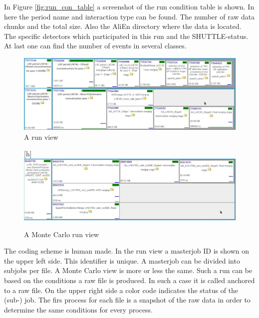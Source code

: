 In Figure \ref{fig:run_con_table} a screenshot of the run condition table is shown. In here the period name and interaction type can be found. The number of raw data chunks and the total size. Also the AliEn directory where the data is located. The specific detectors which participated in this run and the SHUTTLE-status. At last one can find the number of events in several classes.

\begin{figure}[h]
  \begin{center}
    \includegraphics[scale=0.2]{./images/run_view.jpg}
    \caption{A run view}
    \label{fig:run_view}
  \end{center}
\end{figure}


\begin{figure}
  \begin{center}[h]
    \includegraphics[scale=0.2]{./images/run_view_mc.jpg}
    \caption{A Monte Carlo run view}
    \label{fig:run_view_mc}
  \end{center}
\end{figure}

The coding scheme is human made. In the run view a masterjob ID is shown on the upper left side. This identifier is unique. A masterjob can be divided into subjobs per file. A Monte Carlo view is more or less the same. Such a run can be based on the conditions a raw file is produced. In such a case it is called anchored to a raw file. On the upper right side a color code indicates the status of the (sub-) job. The firs process for each file is a snapshot of the raw data in order to determine the same conditions for every process.

